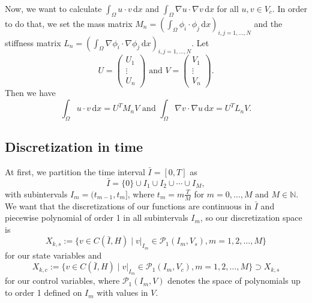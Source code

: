 Now, we want to calculate $\int_\Omega u \cdot v \,\mathrm{d}x$ and $\int_\Omega \nabla u \cdot \nabla v \,\mathrm{d}x$ for all $u,v\in  V_c$. In order to do that, we set the mass matrix $M_n = \left(\int_\Omega \phi_i \cdot \phi_j \,\mathrm{d}x\right)_{i,j=1,\dotsc,N}$ and the stiffness matrix $L_n = \left(\int_\Omega \nabla\phi_i \cdot \nabla\phi_j \,\mathrm{d}x\right)_{i,j=1,\dotsc,N}$. Let%
\begin{displaymath}
U=\begin{pmatrix} U_1 \\ \vdots \\ U_n \end{pmatrix}\text{ and }V=\begin{pmatrix} V_1 \\ \vdots \\ V_n \end{pmatrix}.
\end{displaymath}
Then we have
\begin{displaymath}
\int_\Omega u \cdot v \,\mathrm{d}x=U^TM_nV\text{ and }\int_\Omega \nabla v \cdot \nabla u \,\mathrm{d}x=U^TL_nV.
\end{displaymath}


\subsection{Discretization in time}
At first, we partition the time interval $\bar{I}=[0,T]$ as
\begin{displaymath}
\bar{I}=\{0\}\cup I_1\cup I_2\cup\dotsb\cup I_M,
\end{displaymath}
with subintervals $I_m=(t_{m-1},t_m]$, where $t_m=m\frac{T}{M}$ for $m=0,\dotsc, M$ and $M\in\mathbb{N}$. We want that the discretizations of our functions are continuous in $\bar{I}$ and piecewise polynomial of order 1 in all subintervals $I_m$, so our discretization space is
\begin{displaymath}
X_{k,s}:=\{v\in C(\bar{I},H)\mid v |_{I_m}\in\mathcal{P}_1(I_m,V_s),m=1,2,\dotsc,M\}
\end{displaymath}
for our state variables and
\begin{displaymath}
X_{k,c}:=\{v\in C(\bar{I},H)\mid v |_{I_m}\in\mathcal{P}_1(I_m,V_c),m=1,2,\dotsc,M\}\supset X_{k,s}
\end{displaymath}
for our control variables, where $\mathcal{P}_1(I_m,V)$ denotes the space of polynomials up to order 1 defined on $I_m$ with values in $V$.

